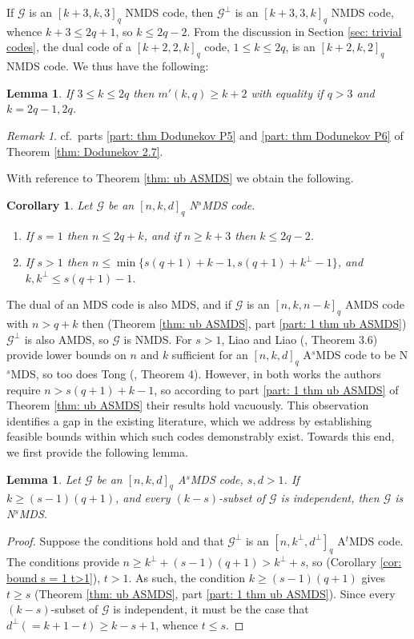 \documentclass[11pt,a4paper]{amsart}
\newcommand{\AS}{ A$^s$MDS }
\newcommand{\G}{\mathcal{G}}
\theoremstyle{plain}
\newtheorem{lemma}[theorem]{Lemma}
\newtheorem{corollary}[theorem]{Corollary}
\theoremstyle{definition}
\theoremstyle{remark}
\newtheorem{remark}[theorem]{Remark}
\begin{document}
	If $\G$ is an $[k+3,k,3]_q$ NMDS code, then $\G^{\perp}$ is an $[k+3,3,k]_q$ NMDS code, whence $k+3\le 2q+1$, so $k\le 2q-2$. From the discussion in Section \ref{sec: trivial codes}, the dual code of a $[k+2,2,k]_q$ code, $1\le k\le 2q$, is an $ [k+2,k,2]_q$ NMDS code. We thus have the following:

	\begin{lemma} \label{lem: NMDS special k}
		If $3\le k \le 2q $ then $m'(k,q)\ge k+2$ with equality if $q>3$ and $k = 2q-1,2q $.
	\end{lemma}
	\begin{remark}
		cf.\ parts \ref{part: thm Dodunekov P5} and \ref{part: thm Dodunekov P6} of Theorem \ref{thm: Dodunekov 2.7}.
	\end{remark}

	With reference to Theorem \ref{thm: ub ASMDS} we obtain the following.

	\begin{corollary}\label{cor: NMDS general bound}
		Let  $\G$ be an $[n,k,d]_q$ N$^s$MDS code.
		\begin{enumerate}
			\item If $s=1$ then  $n\le 2q +k $, and if $n\ge k+3$ then $k\le 2q-2$.
			\item If $s>1$ then  $n\le \min\{s(q+1)+k-1, s(q+1)+k^\perp-1\}$, and $k,k^\perp \le s(q+1)-1$.
		\end{enumerate}
	\end{corollary}

	The dual of an MDS code is also MDS, and if $\G$ is an $[n,k,n-k]_q$ AMDS code with $n>q+k$  then (Theorem \ref{thm: ub ASMDS}, part \ref{part: 1 thm ub ASMDS}) $\G^\perp$ is also AMDS, so $\G$ is NMDS.  For $s>1$, Liao and Liao (\cite{Liao2014}, Theorem 3.6) provide lower bounds on $n$ and $k$ sufficient for an $[n,k,d]_q$ \AS code to be N$^s$MDS, so too does Tong (\cite{Tong2012}, Theorem 4).  However, in both works the authors require $n>s(q+1)+k-1$, so according to part \ref{part: 1 thm ub ASMDS} of  Theorem \ref{thm: ub ASMDS} their results hold vacuously. This observation identifies a gap in the existing literature, which we address by establishing feasible bounds within which such codes demonstrably exist. Towards this end, we first provide the following lemma.

	\begin{lemma}\label{lem: conditions for NsMDS}
		Let $\G$ be an $[n,k,d]_q$ \AS code, $s,d>1$. If $k\ge (s-1)(q+1)$, and every $(k-s)$-subset of $\G$ is independent, then $\G$ is N$^s$MDS.
	\end{lemma}
	\begin{proof}
		Suppose the conditions hold and that $\G^\perp$ is an $[n,k^\perp,d^\perp]_q$ A$^t$MDS code.  The conditions provide $n\ge k^\perp + (s-1)(q+1)>k^\perp+s$, so (Corollary \ref{cor: bound s = 1 t>1}), $t>1$. As such, the condition $k\ge (s-1)(q+1)$ gives $t\ge s$ (Theorem \ref{thm: ub ASMDS}, part \ref{part: 1 thm ub ASMDS}). Since every $(k-s)$-subset of $\G$ is independent, it must be the case that $d^\perp (=k+1-t) \ge k-s+1$, whence  $t\le s$.
	\end{proof}
\end{document}
